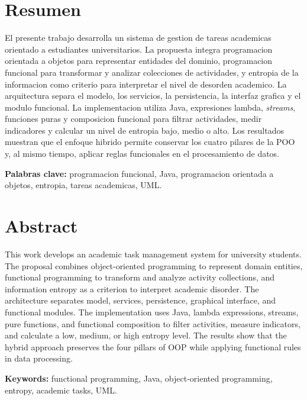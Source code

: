 \documentclass[12pt]{article}
\begin{document}
\tableofcontents
\newpage

\section*{Resumen}

El presente trabajo desarrolla un sistema de gestion de tareas academicas orientado a estudiantes universitarios. La propuesta integra programacion orientada a objetos para representar entidades del dominio, programacion funcional para transformar y analizar colecciones de actividades, y entropia de la informacion como criterio para interpretar el nivel de desorden academico. La arquitectura separa el modelo, los servicios, la persistencia, la interfaz grafica y el modulo funcional. La implementacion utiliza Java, expresiones lambda, \textit{streams}, funciones puras y composicion funcional para filtrar actividades, medir indicadores y calcular un nivel de entropia bajo, medio o alto. Los resultados muestran que el enfoque hibrido permite conservar los cuatro pilares de la POO y, al mismo tiempo, aplicar reglas funcionales en el procesamiento de datos.

\textbf{Palabras clave:} programacion funcional, Java, programacion orientada a objetos, entropia, tareas academicas, UML.

\section*{Abstract}

This work develops an academic task management system for university students. The proposal combines object-oriented programming to represent domain entities, functional programming to transform and analyze activity collections, and information entropy as a criterion to interpret academic disorder. The architecture separates model, services, persistence, graphical interface, and functional modules. The implementation uses Java, lambda expressions, streams, pure functions, and functional composition to filter activities, measure indicators, and calculate a low, medium, or high entropy level. The results show that the hybrid approach preserves the four pillars of OOP while applying functional rules in data processing.

\textbf{Keywords:} functional programming, Java, object-oriented programming, entropy, academic tasks, UML.

\newpage
\end{document}
